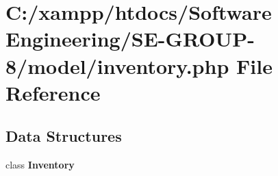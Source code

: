 \section{C\+:/xampp/htdocs/\+Software Engineering/\+S\+E-\/\+G\+R\+O\+U\+P-\/8/model/inventory.php File Reference}
\label{inventory_8php}
\subsection*{Data Structures}
\begin{DoxyCompactItemize}
\item 
class {\bf Inventory}
\end{DoxyCompactItemize}
